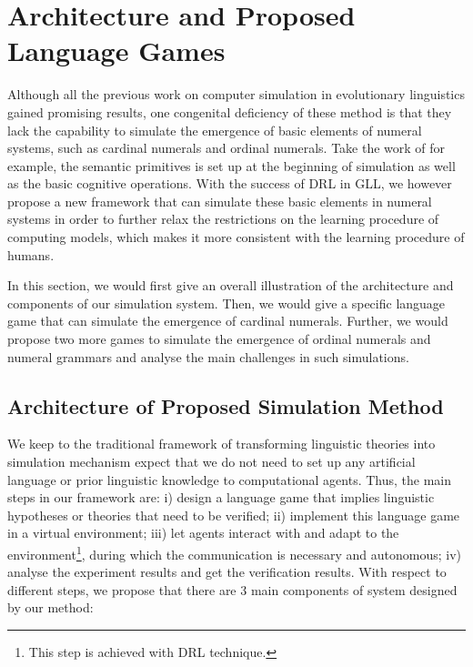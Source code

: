 \documentclass[a4paper,11pt]{article}
\begin{document}
\section{Architecture and Proposed Language Games}
\label{sec:3questions}

Although all the previous work on computer simulation in evolutionary linguistics gained promising results, one congenital deficiency of these method is that they lack the capability to simulate the emergence of basic elements of numeral systems, such as cardinal numerals and ordinal numerals. Take the work of \cite{james1999numeral} for example, the semantic primitives is set up at the beginning of simulation as well as the basic cognitive operations. With the success of DRL in GLL, we however propose a new framework that can simulate these basic elements in numeral systems in order to further relax the restrictions on the learning procedure of computing models, which makes it more consistent with the learning procedure of humans.

In this section, we would first give an overall illustration of the architecture and components of our simulation system. Then, we would give a specific language game that can simulate the emergence of cardinal numerals. Further, we would propose two more games to simulate the emergence of ordinal numerals and numeral grammars and analyse the main challenges in such simulations.

\subsection{Architecture of Proposed Simulation Method}
\label{ssec:3.1architecture}

We keep to the traditional framework of transforming linguistic theories into simulation mechanism expect that we do not need to set up any artificial language or prior linguistic knowledge to computational agents. Thus, the main steps in our framework are: i) design a language game that implies linguistic hypotheses or theories that need to be verified; ii) implement this language game in a virtual environment; iii) let agents interact with and adapt to the environment\footnote{This step is achieved with DRL technique.}, during which the communication is necessary and autonomous; iv) analyse the experiment results and get the verification results. With respect to different steps, we propose that there are 3 main components of system designed by our method:
\end{document}
